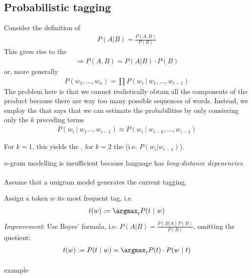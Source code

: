 \documentclass[10pt,twocolumn]{article}
\begin{document}
\subsection{Probabilistic tagging}

Consider the definition of 
\begin{align*}
  P(A|B) = \frac{P(A,B)}{P(B)} 
\end{align*}
This gives rise to the 
\begin{align*}
  \Rightarrow P(A,B) = P(A|B) \cdot P(B)
\end{align*}
or, more generally
\begin{align*}
  P(w_1, ..., w_n) = \prod P(w_i~|~w_1, ..., w_{i-1})
\end{align*}
The problem here is that we cannot realistically obtain all the components of
the product because there are way too many possible sequences of words. Instead,
we employ the  that says that we can estimate the
probabilities by only consiering only the $k$ preceding terms
\begin{align*}
  P(w_i ~|~ w_1 ..., w_{i-1}) \approx P(w_i ~|~ w_{i-k}, ..., w_{i-1})
\end{align*}

For $k=1$, this yields the , for $k=2$ the 
(i.e. $P(w_i | w_{i-1})$).

$n$-gram modelling is insufficient because language has \textit{long-distance depenencies}.

\paragraph{ } Assume that a unigram model generates the
current tagging. 

Assign a token $w$ its most frequent tag, i.e.
\begin{align*}
  t(w) := \argmax_t P(t~|~w)
\end{align*}
\textit{Improvement}: Use Bayes' formula, i.e. $P(A|B) = \frac{P(B|A)P(B)}{P(B)}$,
omitting the quotient:
\begin{align*}
  t(w) := P(t~|~w) = \argmax_t P(t) \cdot P(w~|~t)
\end{align*}

\paragraph{\textit{ \todo }} example
\end{document}
